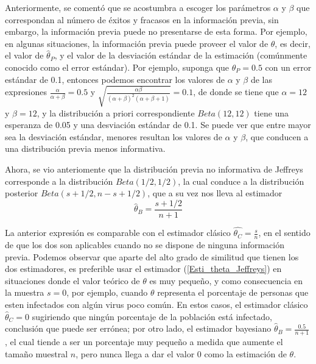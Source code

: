 \documentclass[10pt,openright]{book}\usepackage[]{graphicx}\usepackage[]{color}
\begin{document}
    Anteriormente, se coment\'o que se acostumbra a escoger los par\'ametros $\alpha$ y $\beta$ que correspondan al n\'umero de \'exitos y fracasos en la informaci\'on previa, sin embargo, la informaci\'on previa puede no presentarse de esta forma. Por ejemplo, en algunas situaciones, la informaci\'on previa puede proveer el valor de $\theta$, es decir, el valor de $\hat{\theta}_P$, y el valor de la desviaci\'on est\'andar de la estimaci\'on (com\'unmente conocido como el error est\'andar). Por ejemplo, suponga que $\hat{\theta}_P=0.5$ con un error est\'andar de 0.1, entonces podemos encontrar los valores de $\alpha$ y $\beta$ de las expresiones $\frac{\alpha}{\alpha+\beta}=0.5$ y $\sqrt{\frac{\alpha\beta}{(\alpha+\beta)^2(\alpha+\beta+1)}}=0.1$, de donde se tiene que $\alpha=12$ y $\beta=12$, y la distribuci\'on a priori correspondiente $Beta(12,12)$ tiene una esperanza de 0.05 y una desviaci\'on est\'andar de 0.1. Se puede ver que entre mayor sea la desviaci\'on est\'andar, menores resultan los valores de $\alpha$ y $\beta$, que conducen a una distribuci\'on previa menos informativa.
    
    Ahora, se vio anteriomente que la distribuci\'on previa no informativa de Jeffreys corresponde a la distribuci\'on $Beta(1/2,1/2)$, la cual conduce a la distribuci\'on posterior $Beta(s+1/2,n-s+1/2)$, que a su vez nos lleva al estimador 
    \begin{equation}
    \label{Esti_theta_Jeffreys}
    \hat{\theta}_B=\frac{s+1/2}{n+1}
    \end{equation}
    
    La anterior expresi\'on es comparable con el estimador cl\'asico $\hat{\theta_C}=\frac{s}{n}$, en el sentido de que los dos son aplicables cuando no se dispone de ninguna informaci\'on previa. Podemos observar que aparte del alto grado de similitud que tienen los dos estimadores, es preferible usar el estimador (\ref{Esti_theta_Jeffreys}) en situaciones donde el valor te\'orico de $\theta$ es muy peque\~no, y como consecuencia en la muestra $s=0$, por ejemplo, cuando $\theta$ representa el porcentaje de personas que esten infectados con alg\'un virus poco com\'un. En estos casos, el estimador cl\'asico $\hat{\theta}_C=0$ sugiriendo que ning\'un porcentaje de la poblaci\'on est\'a infectado, conclusi\'on que puede ser err\'onea; por otro lado, el estimador bayesiano $\hat{\theta}_B=\frac{0.5}{n+1}$, el cual tiende a ser un porcentaje muy peque\~no a medida que aumente el tama\~no muestral $n$, pero nunca llega a dar el valor 0 como la estimaci\'on de $\theta$.
    
\end{document}
